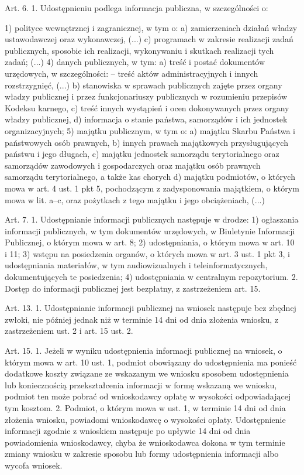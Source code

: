 \begin{prawne}

Art. 6. 1. Udostępnieniu podlega informacja publiczna, w szczególności o:

1) polityce wewnętrznej i zagranicznej, w tym o:
a) zamierzeniach działań władzy ustawodawczej oraz wykonawczej,
(...)
c) programach w zakresie realizacji zadań publicznych, sposobie ich realizacji, wykonywaniu i skutkach realizacji tych zadań;
(...)
4) danych publicznych, w tym:
a) treść i postać dokumentów urzędowych, w szczególności:
– treść aktów administracyjnych i innych rozstrzygnięć,
(...)
b) stanowiska w sprawach publicznych zajęte przez organy władzy publicznej i przez funkcjonariuszy publicznych w rozumieniu przepisów Kodeksu karnego,
c) treść innych wystąpień i ocen dokonywanych przez organy władzy publicznej,
d) informacja o stanie państwa, samorządów i ich jednostek organizacyjnych;
5) majątku publicznym, w tym o:
a) majątku Skarbu Państwa i państwowych osób prawnych,
b) innych prawach majątkowych przysługujących państwu i jego długach,
c) majątku jednostek samorządu terytorialnego oraz samorządów zawodowych i gospodarczych oraz majątku osób prawnych samorządu terytorialnego, a także kas chorych d) majątku podmiotów, o których mowa w art. 4 ust. 1 pkt 5, pochodzącym z zadysponowania majątkiem, o którym mowa w lit. a–c, oraz pożytkach z tego majątku i jego obciążeniach,
(...)

Art. 7. 1. Udostępnianie informacji publicznych następuje w drodze:
1) ogłaszania informacji publicznych, w tym dokumentów urzędowych, w Biuletynie Informacji Publicznej, o którym mowa w art. 8;
2) udostępniania, o którym mowa w art. 10 i 11;
3) wstępu na posiedzenia organów, o których mowa w art. 3 ust. 1 pkt 3, i udostępniania materiałów, w tym audiowizualnych i teleinformatycznych, dokumentujących te posiedzenia;
4) udostępniania w centralnym repozytorium.
2. Dostęp do informacji publicznej jest bezpłatny, z zastrzeżeniem art. 15.

Art. 13. 1. Udostępnianie informacji publicznej na wniosek następuje bez zbędnej zwłoki, nie później jednak niż w terminie 14 dni od dnia złożenia wniosku, z zastrzeżeniem ust. 2 i art. 15 ust. 2.
\end{prawne}
\begin{prawne}
Art. 15. 1. Jeżeli w wyniku udostępnienia informacji publicznej na wniosek,
o którym mowa w art. 10 ust. 1, podmiot obowiązany do udostępnienia ma ponieść
dodatkowe koszty związane ze wskazanym we wniosku sposobem udostępnienia lub
koniecznością przekształcenia informacji w formę wskazaną we wniosku, podmiot ten
może pobrać od wnioskodawcy opłatę w wysokości odpowiadającej tym kosztom.
2. Podmiot, o którym mowa w ust. 1, w terminie 14 dni od dnia złożenia
wniosku, powiadomi wnioskodawcę o wysokości opłaty. Udostępnienie informacji
zgodnie z wnioskiem następuje po upływie 14 dni od dnia powiadomienia
wnioskodawcy, chyba że wnioskodawca dokona w tym terminie zmiany wniosku
w zakresie sposobu lub formy udostępnienia informacji albo wycofa wniosek.
\end{prawne}
